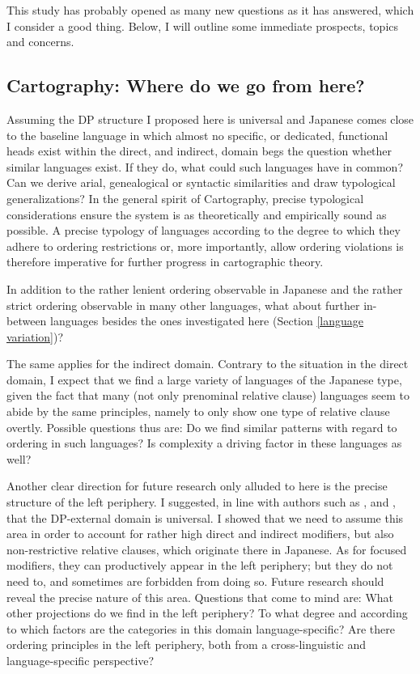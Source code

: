 This study has probably opened as many new questions as it has answered, which I consider a good thing. Below, I will outline some immediate prospects, topics and concerns.

\subsection{Cartography: Where do we go from here?}

Assuming the DP structure I proposed here is universal and Japanese comes close to the baseline language in which almost no specific, or dedicated, functional heads exist within the direct, and indirect, domain begs the question whether similar languages exist. If they do, what could such languages have in common? Can we derive arial, genealogical or syntactic similarities and draw typological generalizations? In the general spirit of Cartography, precise typological considerations ensure the system is as theoretically and empirically sound as possible. A precise typology of languages according to the degree to which they adhere to ordering restrictions or, more importantly, allow ordering violations is therefore imperative for further progress in cartographic theory.

In addition to the rather lenient ordering observable in Japanese and the rather strict ordering observable in many other languages, what about further in-between languages besides the ones investigated here (Section \ref{language variation})?

The same applies for the indirect domain. Contrary to the situation in the direct domain, I expect that we find a large variety of languages of the Japanese type, given the fact that many (not only prenominal relative clause) languages seem to abide by the same principles, namely to only show one type of relative clause overtly. Possible questions thus are: Do we find similar patterns with regard to ordering in such languages? Is complexity a driving factor in these languages as well?

Another clear direction for future research only alluded to here is the precise structure of the left periphery. I suggested, in line with authors such as \citet{grohmann:2003:prolific}, \citet{laenzlinger:2005:french, laenzlinger:2011:elements} and \citet{kim:2019:syntax}, that the DP-external domain is universal. I showed that we need to assume this area in order to account for rather high direct and indirect modifiers, but also non-restrictive relative clauses, which originate there in Japanese. As for focused modifiers, they can productively appear in the left periphery; but they do not need to, and sometimes are forbidden from doing so. Future research should reveal the precise nature of this area. Questions that come to mind are: What other projections do we find in the left periphery? To what degree and according to which factors are the categories in this domain language-specific? Are there ordering principles in the left periphery, both from a cross-linguistic and language-specific perspective? 


